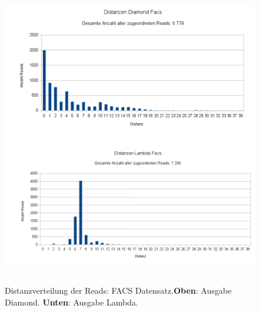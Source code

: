 \documentclass[10pt, a4paper]{article}[08.12.2015]
\begin{document}
    \begin{figure}[H]
      \centering
      \noindent\includegraphics[width=\linewidth,height=13cm,
      keepaspectratio]{Abbildungen/Facs_Distanzen_both.png}
      \caption[Distanzverteilung der Reads: FACS Datensatz.]{\small{Distanzverteilung der Reads: FACS Datensatz.\newline \textbf{Oben}: Ausgabe Diamond. \textbf{Unten}: Ausgabe Lambda.}}
    \end{figure}
    
\end{document}
